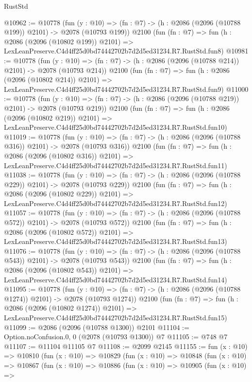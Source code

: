 \begin{lexlean}{RustStd}
\begin{coremodule}
@10962 := @10778
    (fun (y : @10) => (fn : @7) -> (h : @2086 (@2096 (@10788 @199)) @2101) -> @2078 (@10793 @199))
    @2100
    (fun (fn : @7) =>
    fun (h : @2086 (@2096 (@10802 @199)) @2101) =>
    LexLeanPreserve.C4d4ff25d0bd74442702b7d2d5ed31234.R7.RustStd.fun8)
@10981 := @10778
    (fun (y : @10) => (fn : @7) -> (h : @2086 (@2096 (@10788 @214)) @2101) -> @2078 (@10793 @214))
    @2100
    (fun (fn : @7) =>
    fun (h : @2086 (@2096 (@10802 @214)) @2101) =>
    LexLeanPreserve.C4d4ff25d0bd74442702b7d2d5ed31234.R7.RustStd.fun9)
@11000 := @10778
    (fun (y : @10) => (fn : @7) -> (h : @2086 (@2096 (@10788 @219)) @2101) -> @2078 (@10793 @219))
    @2100
    (fun (fn : @7) =>
    fun (h : @2086 (@2096 (@10802 @219)) @2101) =>
    LexLeanPreserve.C4d4ff25d0bd74442702b7d2d5ed31234.R7.RustStd.fun10)
@11019 := @10778
    (fun (y : @10) => (fn : @7) -> (h : @2086 (@2096 (@10788 @316)) @2101) -> @2078 (@10793 @316))
    @2100
    (fun (fn : @7) =>
    fun (h : @2086 (@2096 (@10802 @316)) @2101) =>
    LexLeanPreserve.C4d4ff25d0bd74442702b7d2d5ed31234.R7.RustStd.fun11)
@11038 := @10778
    (fun (y : @10) => (fn : @7) -> (h : @2086 (@2096 (@10788 @229)) @2101) -> @2078 (@10793 @229))
    @2100
    (fun (fn : @7) =>
    fun (h : @2086 (@2096 (@10802 @229)) @2101) =>
    LexLeanPreserve.C4d4ff25d0bd74442702b7d2d5ed31234.R7.RustStd.fun12)
@11057 := @10778
    (fun (y : @10) => (fn : @7) -> (h : @2086 (@2096 (@10788 @572)) @2101) -> @2078 (@10793 @572))
    @2100
    (fun (fn : @7) =>
    fun (h : @2086 (@2096 (@10802 @572)) @2101) =>
    LexLeanPreserve.C4d4ff25d0bd74442702b7d2d5ed31234.R7.RustStd.fun13)
@11076 := @10778
    (fun (y : @10) => (fn : @7) -> (h : @2086 (@2096 (@10788 @543)) @2101) -> @2078 (@10793 @543))
    @2100
    (fun (fn : @7) =>
    fun (h : @2086 (@2096 (@10802 @543)) @2101) =>
    LexLeanPreserve.C4d4ff25d0bd74442702b7d2d5ed31234.R7.RustStd.fun14)
@11095 := @10778
    (fun (y : @10) => (fn : @7) -> (h : @2086 (@2096 (@10788 @1274)) @2101) -> @2078 (@10793 @1274))
    @2100
    (fun (fn : @7) =>
    fun (h : @2086 (@2096 (@10802 @1274)) @2101) =>
    LexLeanPreserve.C4d4ff25d0bd74442702b7d2d5ed31234.R7.RustStd.fun15)
@11099 := @2086 (@2096 (@10788 @1300)) @2101
@11104 := Option.noConfusion.{0, 0} (@2078 (@10793 @1300)) @7
@11105 := @748 @7
@11107 := @11104 @11105 @7
@11108 := @2099 @2145
@11155 := fun (x : @10) =>
  @10810
    (fun (x : @10) =>
    @10829
      (fun (x : @10) =>
      @10848
        (fun (x : @10) =>
        @10867
          (fun (x : @10) =>
          @10886
            (fun (x : @10) =>
            @10905
              (fun (x : @10) =>

\end{coremodule}
\end{lexlean}
